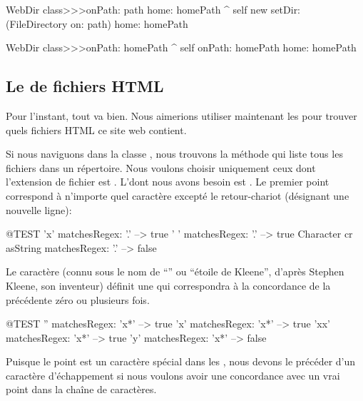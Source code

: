 \documentclass[a4paper,10pt,twoside]{book}
\begin{document}
\begin{code}{}
WebDir class>>>onPath: path home: homePath
	^ self new setDir: (FileDirectory on: path) home: homePath

WebDir class>>>onPath: homePath
	^ self onPath: homePath home: homePath
\end{code}

\subsection{Le \patmatch de fichiers HTML}

Pour l'instant, tout va bien.
Nous aimerions utiliser maintenant les \expregs{} pour trouver quels
fichiers HTML ce site web contient.

Si nous naviguons dans la classe , nous trouvons la
méthode  qui liste tous les fichiers dans un répertoire.
Nous voulons choisir uniquement ceux dont l'extension de fichier est
. L'\expreg dont nous avons besoin est .
Le premier point correspond à n'importe quel caractère excepté le
retour-chariot (désignant une nouvelle ligne):

\begin{code}{@TEST}
'x' matchesRegex: '.' --> true
' ' matchesRegex: '.'  --> true
Character cr asString matchesRegex: '.' --> false
\end{code}

Le caractère \ct{*} (connu sous le nom de ``\ind{\kleenestar}'' ou ``étoile de Kleene'',
d'après Stephen Kleene, son inventeur)
définit une \expreg qui correspondra à la concordance de la
précédente \expreg zéro ou plusieurs fois.

\begin{code}{@TEST}
'' matchesRegex: 'x*'     --> true
'x' matchesRegex: 'x*'   --> true
'xx' matchesRegex: 'x*' --> true
'y' matchesRegex: 'x*'   --> false
\end{code}

Puisque le point est un caractère spécial dans les \expregs, 
nous devons le précéder d'un caractère d'échappement 
si nous voulons avoir une concordance avec un vrai point dans la
chaîne de caractères.
\end{document}
